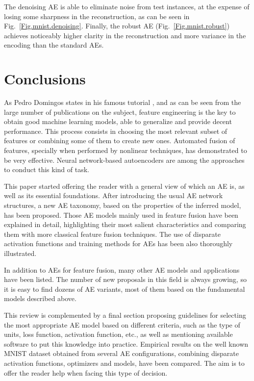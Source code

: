 \documentclass[preprint,5p,compress]{elsarticle}
\begin{document}
The denoising AE is able to eliminate noise from test instances, at the expense of losing some sharpness in the reconstruction, as can be seen in Fig.~\ref{Fig.mnist.denoising}. Finally, the robust AE (Fig.~\ref{Fig.mnist.robust}) achieves noticeably higher clarity in the reconstruction and more variance in the encoding than the standard AEs.


\section{Conclusions}\label{Conclusions}
As Pedro Domingos states in his famous tutorial \cite{Domingos2012AFU}, and as can be seen from the large number of publications on the subject, feature engineering is the key to obtain good machine learning models, able to generalize and provide decent performance. This process consists in choosing the most relevant subset of features or combining some of them to create new ones. Automated fusion of features, specially when performed by nonlinear techniques, has demonstrated to be very effective. Neural network-based autoencoders are among the approaches to conduct this kind of task.

This paper started offering the reader with a general view of which an AE is, as well as its essential foundations. After introducing the usual AE network structures, a new AE taxonomy, based on the properties of the inferred model, has been proposed. Those AE models mainly used in feature fusion have been explained in detail, highlighting their most salient characteristics and comparing them with more classical feature fusion techniques. The use of disparate activation functions and training methods for AEs has been also thoroughly illustrated. 

In addition to AEs for feature fusion, many other AE models and applications have been listed. The number of new proposals in this field is always growing, so it is easy to find dozens of AE variants, most of them based on the fundamental models described above.

This review is complemented by a final section proposing guidelines for selecting the most appropriate AE model based on different criteria, such as the type of units, loss function, activation function, etc., as well as mentioning available software to put this knowledge into practice. Empirical results on the well known MNIST dataset obtained from several AE configurations, combining disparate activation functions, optimizers and models, have been compared. The aim is to offer the reader help when facing this type of decision.
\end{document}
